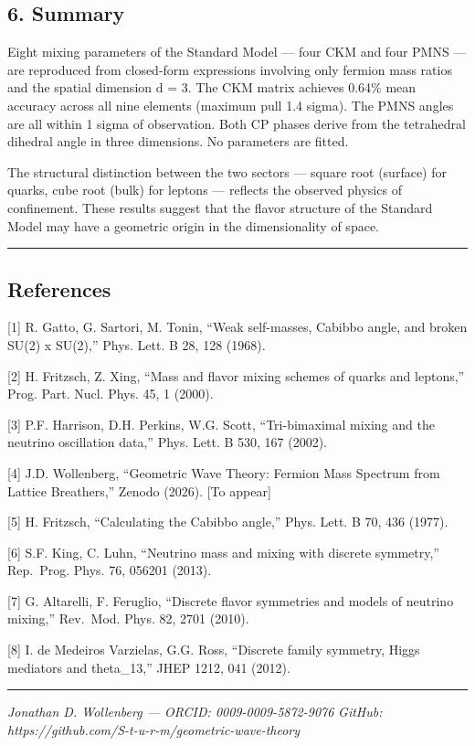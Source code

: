 \documentclass[
]{article}
\begin{document}
\subsection{6. Summary}\label{summary}

Eight mixing parameters of the Standard Model --- four CKM and four PMNS
--- are reproduced from closed-form expressions involving only fermion
mass ratios and the spatial dimension d = 3. The CKM matrix achieves
0.64\% mean accuracy across all nine elements (maximum pull 1.4 sigma).
The PMNS angles are all within 1 sigma of observation. Both CP phases
derive from the tetrahedral dihedral angle in three dimensions. No
parameters are fitted.

The structural distinction between the two sectors --- square root
(surface) for quarks, cube root (bulk) for leptons --- reflects the
observed physics of confinement. These results suggest that the flavor
structure of the Standard Model may have a geometric origin in the
dimensionality of space.

\begin{center}\rule{0.5\linewidth}{0.5pt}\end{center}

\subsection{References}\label{references}

{[}1{]} R. Gatto, G. Sartori, M. Tonin, ``Weak self-masses, Cabibbo
angle, and broken SU(2) x SU(2),'' Phys. Lett. B 28, 128 (1968).

{[}2{]} H. Fritzsch, Z. Xing, ``Mass and flavor mixing schemes of quarks
and leptons,'' Prog. Part. Nucl. Phys. 45, 1 (2000).

{[}3{]} P.F. Harrison, D.H. Perkins, W.G. Scott, ``Tri-bimaximal mixing
and the neutrino oscillation data,'' Phys. Lett. B 530, 167 (2002).

{[}4{]} J.D. Wollenberg, ``Geometric Wave Theory: Fermion Mass Spectrum
from Lattice Breathers,'' Zenodo (2026). {[}To appear{]}

{[}5{]} H. Fritzsch, ``Calculating the Cabibbo angle,'' Phys. Lett. B
70, 436 (1977).

{[}6{]} S.F. King, C. Luhn, ``Neutrino mass and mixing with discrete
symmetry,'' Rep.~Prog. Phys. 76, 056201 (2013).

{[}7{]} G. Altarelli, F. Feruglio, ``Discrete flavor symmetries and
models of neutrino mixing,'' Rev.~Mod. Phys. 82, 2701 (2010).

{[}8{]} I. de Medeiros Varzielas, G.G. Ross, ``Discrete family symmetry,
Higgs mediators and theta\_13,'' JHEP 1212, 041 (2012).

\begin{center}\rule{0.5\linewidth}{0.5pt}\end{center}

\emph{Jonathan D. Wollenberg --- ORCID: 0009-0009-5872-9076}
\emph{GitHub: https://github.com/S-t-u-r-m/geometric-wave-theory}
\end{document}

